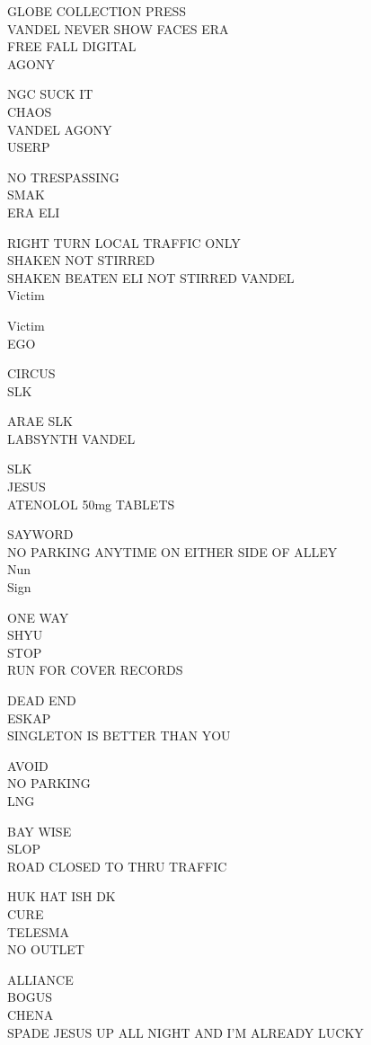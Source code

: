 \documentclass[10pt,letterpaper]{article}
\begin{document}
GLOBE COLLECTION PRESS\\
VANDEL NEVER SHOW FACES ERA\\
FREE FALL DIGITAL\\
AGONY

NGC SUCK IT\\
CHAOS\\
VANDEL AGONY\\
USERP

NO TRESPASSING\\
SMAK\\
ERA ELI

RIGHT TURN LOCAL TRAFFIC ONLY\\
SHAKEN NOT STIRRED\\
SHAKEN BEATEN ELI NOT STIRRED VANDEL\\
Victim

Victim\\
EGO

CIRCUS\\
SLK

ARAE SLK\\
LABSYNTH VANDEL

SLK\\
JESUS\\
ATENOLOL 50mg TABLETS

SAYWORD\\
NO PARKING ANYTIME ON EITHER SIDE OF ALLEY\\
Nun\\
Sign

ONE WAY\\
SHYU\\
STOP\\
RUN FOR COVER RECORDS

DEAD END\\
ESKAP\\
SINGLETON IS BETTER THAN YOU

AVOID\\
NO PARKING\\
LNG

BAY WISE\\
SLOP\\
ROAD CLOSED TO THRU TRAFFIC

HUK HAT ISH DK\\
CURE\\
TELESMA\\
NO OUTLET

ALLIANCE\\
BOGUS\\
CHENA\\
SPADE JESUS UP ALL NIGHT AND I'M ALREADY LUCKY
\end{document}
